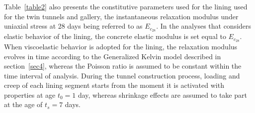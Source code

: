 \documentclass[a4paper,fleqn]{cas-sc}
\begin{document}
Table~\ref{table2} also presents the constitutive parameters used for the lining used for the twin tunnels and gallery, the instantaneous relaxation modulus under uniaxial stress at 28 days being referred to as $E_{c_{28}}$. In the analyses that considers elastic behavior of the lining, the concrete elastic modulus is set equal to $E_{c_{28}}$. When viscoelastic behavior is adopted for the lining, the relaxation modulus evolves in time according to the Generalized Kelvin model described in section~\ref{sec4}, whereas the Poisson ratio is assumed to be constant within the time interval of analysis. During the tunnel construction process, loading and creep of each lining segment starts from the moment it is activated with properties at age $t_0=1$ day, whereas shrinkage effects are assumed to take part at the age of $t_s=7$ days.
\end{document}

